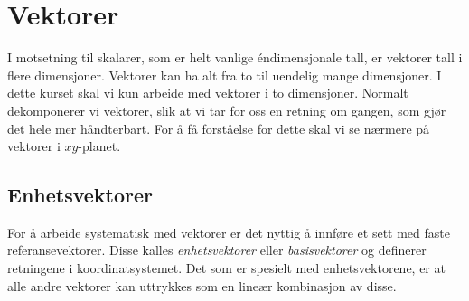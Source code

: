 
\section{Vektorer}
I motsetning til skalarer, som er helt vanlige éndimensjonale tall, er vektorer tall i flere dimensjoner. Vektorer kan ha alt fra to til uendelig mange dimensjoner. I dette kurset skal vi kun arbeide med vektorer i to dimensjoner. Normalt dekomponerer vi vektorer, slik at vi tar for oss en retning om gangen, som gjør det hele mer håndterbart. For å få forståelse for dette skal vi se nærmere på vektorer i $xy$-planet.



\subsection{Enhetsvektorer}

For å arbeide systematisk med vektorer er det nyttig å innføre et sett med faste referansevektorer. Disse kalles \emph{enhetsvektorer} eller \emph{basisvektorer} og definerer retningene i koordinatsystemet. Det som er spesielt med enhetsvektorene, er at alle andre vektorer kan uttrykkes som en lineær kombinasjon av disse.


